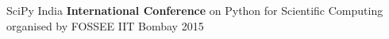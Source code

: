 \begin{cvhonors}
  \cvhonor
    {SciPy India}
    {\textbf{International Conference} on Python for Scientific Computing organised by FOSSEE}
    {IIT Bombay}
    {2015}
\end{cvhonors}
